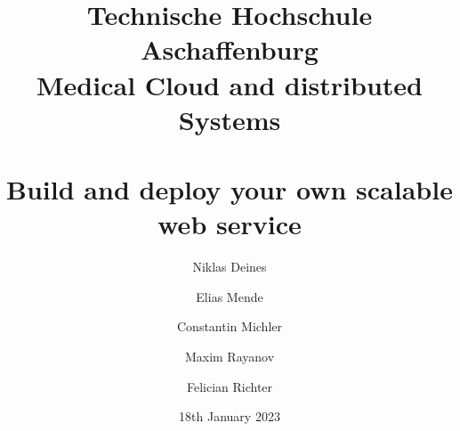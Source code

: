 \documentclass[a4paper, 12pt, twoside]{report}
\title{\large{Technische Hochschule Aschaffenburg \\ Medical Cloud and distributed Systems}\vspace{1cm} \\\HUGE{Project Kubernetes} \\ \Large{Build and deploy your own scalable web service}\vspace{1cm}}
\author{Niklas Deines \and Elias Mende \and Constantin Michler \and Maxim Rayanov \and Felician Richter}
\date{18th January 2023}
\begin{document}
    \nonfrenchspacing
    \maketitle

    \renewcommand\contentsname{Table of Contents}
    \tableofcontents

    
    
    
    \printbibliography
\end{document}
